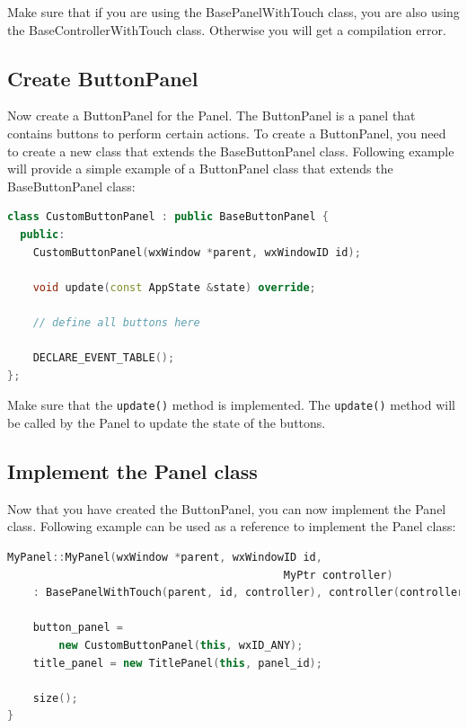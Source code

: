 Make sure that if you are using the BasePanelWithTouch class, you are also using the BaseControllerWithTouch class. Otherwise you will get a compilation error.

\subsection{Create ButtonPanel}

Now create a ButtonPanel for the Panel. The ButtonPanel is a panel that contains buttons to perform certain actions. To create a ButtonPanel, you need to create a new class that extends the BaseButtonPanel class. Following example will provide a simple example of a ButtonPanel class that extends the BaseButtonPanel class:

\begin{lstlisting}[language=C++, caption={CustomButtonPanel class example}]
class CustomButtonPanel : public BaseButtonPanel {
  public:
    CustomButtonPanel(wxWindow *parent, wxWindowID id);

    void update(const AppState &state) override;

    // define all buttons here

    DECLARE_EVENT_TABLE();
};
\end{lstlisting}

Make sure that the \texttt{update()} method is implemented. The \texttt{update()} method will be called by the Panel to update the state of the buttons.

\subsection{Implement the Panel class}

Now that you have created the ButtonPanel, you can now implement the Panel class. Following example can be used as a reference to implement the Panel class:

\begin{lstlisting}[language=C++, caption={Implementation of MyPanel class}]
MyPanel::MyPanel(wxWindow *parent, wxWindowID id,
                                           MyPtr controller)
    : BasePanelWithTouch(parent, id, controller), controller(controller) {

    button_panel =
        new CustomButtonPanel(this, wxID_ANY);
    title_panel = new TitlePanel(this, panel_id);

    size();
}
\end{lstlisting}

